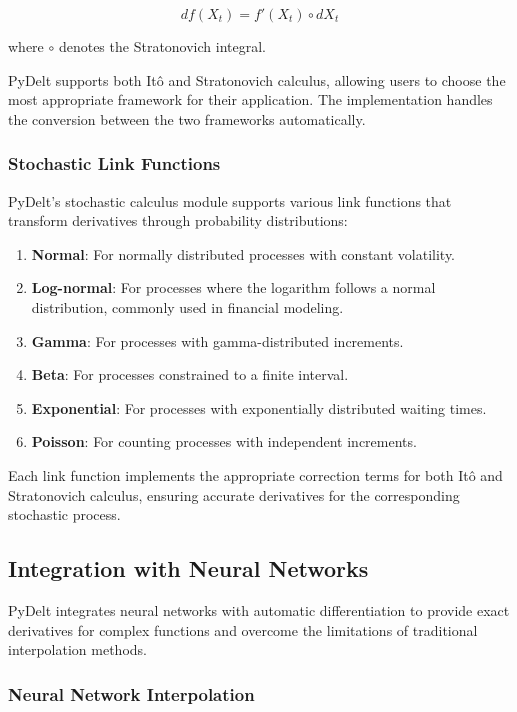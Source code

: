 \documentclass[11pt,a4paper]{article}
\begin{document}
\begin{equation}
df(X_t) = f'(X_t) \circ dX_t
\end{equation}

where $\circ$ denotes the Stratonovich integral.

PyDelt supports both Itô and Stratonovich calculus, allowing users to choose the most appropriate framework for their application. The implementation handles the conversion between the two frameworks automatically.

\subsubsection{Stochastic Link Functions}

PyDelt's stochastic calculus module supports various link functions that transform derivatives through probability distributions:

\begin{enumerate}
    \item \textbf{Normal}: For normally distributed processes with constant volatility.
    \item \textbf{Log-normal}: For processes where the logarithm follows a normal distribution, commonly used in financial modeling.
    \item \textbf{Gamma}: For processes with gamma-distributed increments.
    \item \textbf{Beta}: For processes constrained to a finite interval.
    \item \textbf{Exponential}: For processes with exponentially distributed waiting times.
    \item \textbf{Poisson}: For counting processes with independent increments.
\end{enumerate}

Each link function implements the appropriate correction terms for both Itô and Stratonovich calculus, ensuring accurate derivatives for the corresponding stochastic process.

\subsection{Integration with Neural Networks}

PyDelt integrates neural networks with automatic differentiation to provide exact derivatives for complex functions and overcome the limitations of traditional interpolation methods.

\subsubsection{Neural Network Interpolation}
\end{document}
